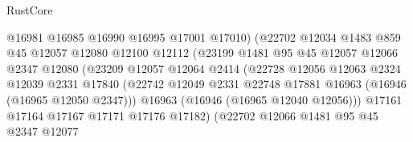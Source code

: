 \begin{lexlean}{RustCore}
\begin{coremodule}
                                    @16981
                                    @16985
                                    @16990
                                    @16995
                                    @17001
                                    @17010)
                                  (@22702
                                    @12034
                                    @1483
                                    @859
                                    @45
                                    @12057
                                    @12080
                                    @12100
                                    @12112
                                    (@23199
                                      @1481
                                      @95
                                      @45
                                      @12057
                                      @12066
                                      @2347
                                      @12080
                                      (@23209
                                        @12057
                                        @12064
                                        @2414
                                        (@22728
                                          @12056
                                          @12063
                                          @2324
                                          @12039
                                          @2331
                                          @17840
                                          (@22742
                                            @12049
                                            @2331
                                            @22748
                                            @17881
                                            @16963
                                            (@16946 (@16965 @12050 @2347)))
                                          @16963
                                          (@16946 (@16965 @12040 @12056)))
                                        @17161
                                        @17164
                                        @17167
                                        @17171
                                        @17176
                                        @17182)
                                      (@22702
                                        @12066
                                        @1481
                                        @95
                                        @45
                                        @2347
                                        @12077

\end{coremodule}
\end{lexlean}
